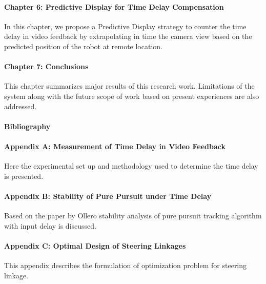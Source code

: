 \paragraph*{Chapter 6: Predictive Display for Time Delay Compensation\\}
In this chapter,  we propose a Predictive Display strategy to counter the time delay in video feedback by extrapolating in time  the camera view based on the predicted position of the robot at remote location. 

\paragraph*{Chapter 7: Conclusions\\}
This chapter summarizes major results of this research work. Limitations of the system along with the future scope of work based on present experiences are also addressed.


\paragraph*{Bibliography}
\paragraph*{Appendix A:  Measurement of Time Delay in Video Feedback  \\}
Here the experimental set up and methodology used to determine the time delay is presented.
\paragraph*{Appendix B:  Stability of Pure Pursuit  under Time Delay \\}
Based on the paper by Ollero \cite{ollero1995stability} stability analysis of pure pursuit tracking algorithm with input delay is discussed.
\paragraph*{Appendix C:  Optimal Design of Steering Linkages \\} 
This appendix describes the formulation of optimization problem for steering linkage.